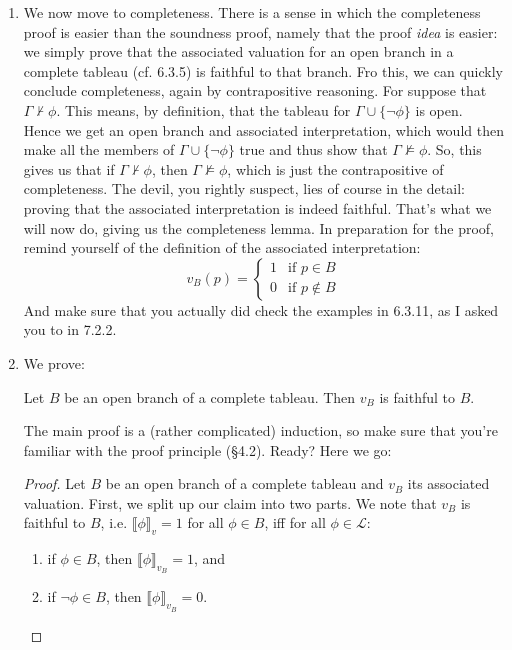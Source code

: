 \begin{enumerate}[\thesection.1]

	\item We now move to completeness. There is a sense in which the completeness proof is easier than the soundness proof, namely that the proof \emph{idea} is easier: we simply prove that the associated valuation for an open branch in a complete tableau (cf. 6.3.5) is faithful to that branch. Fro this, we can quickly conclude completeness, again by contrapositive reasoning. For suppose that $\Gamma\nvdash\phi$. This means, by definition, that the tableau for $\Gamma\cup\{\neg\phi\}$ is open. Hence we get an open branch and associated interpretation, which would then make all the members of $\Gamma\cup\{\neg\phi\}$ true and thus show that $\Gamma\nvDash\phi$. So, this gives us that if $\Gamma\nvdash\phi$, then $\Gamma\nvDash\phi$, which is just the contrapositive of completeness. The devil, you rightly suspect, lies of course in the detail: proving that the associated interpretation is indeed faithful. That's what we will now do, giving us the completeness lemma. In preparation for the proof, remind yourself of the definition of the associated interpretation:
	\[v_B(p)=\begin{cases} 1 &\text{if }p\in B\\0&\text{if }p\notin B\end{cases}\]
	And make sure that you actually did check the examples in 6.3.11, as I asked you to in 7.2.2.
	
	\item We prove:
	\begin{lemma}
	Let $B$ be an open branch of a complete tableau. Then $v_B$ is faithful to $B$.
	\end{lemma}
	The main proof is a (rather complicated) induction, so make sure that you're familiar with the proof principle (\S4.2). Ready? Here we go:
	\begin{proof}
	Let $B$ be an open branch of a complete tableau and $v_B$ its associated valuation. First, we split up our claim into two parts. We note that $v_B$ is faithful to $B$, i.e. $\llbracket\phi\rrbracket_v=1$ for all $\phi\in B$, iff for all $\phi\in\mathcal{L}$:
	\begin{enumerate}[1.]
	
		\item if $\phi\in B$, then $\llbracket\phi\rrbracket_{v_B}=1$, and 
		\item if $\neg \phi\in B$, then $\llbracket\phi\rrbracket_{v_B}=0$.
	

\end{enumerate}
\end{proof}
\end{enumerate}
